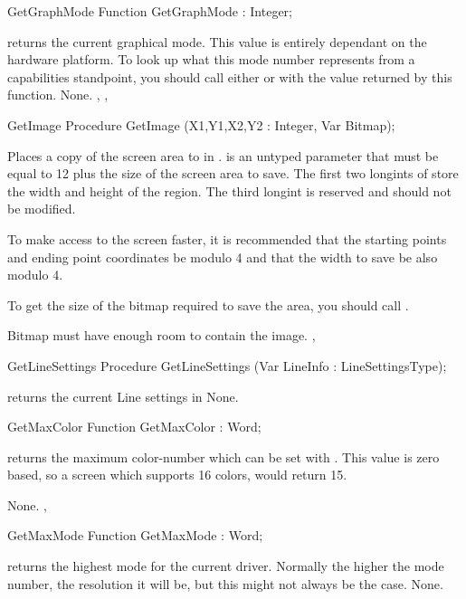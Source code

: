\begin{function}{GetGraphMode}
\Declaration
Function GetGraphMode  : Integer;

\Description
{} returns the current graphical mode. This value is
entirely dependant on the hardware platform. To look up what this
mode number represents from a capabilities standpoint, you should
call either  or  with the
value returned by this function.
\Errors
None.
\SeeAlso
{}, , 
\end{function}

\begin{procedure}{GetImage}
\Declaration
Procedure GetImage (X1,Y1,X2,Y2 : Integer, Var Bitmap);

\Description
{}
Places a copy of the screen area  to  in .
 is an untyped parameter that must be equal to 12 plus the size
of the screen area to save. The first two longints of  store
the width and height of the region. The third longint is reserved and should
not be modified.

To make access to the screen faster, it is recommended that the starting
points and ending point coordinates be modulo 4 and that the width to
save be also modulo 4.

To get the size of the bitmap required to save the area, you should call
.

\Errors
Bitmap must have enough room to contain the image.
\SeeAlso
{},
\end{procedure}

\begin{procedure}{GetLineSettings}
\Declaration
Procedure GetLineSettings (Var LineInfo : LineSettingsType);

\Description
{} returns the current Line settings in
\Errors
None.
\SeeAlso
{}
\end{procedure}
\begin{function}{GetMaxColor}
\Declaration
Function GetMaxColor  : Word;

\Description
{} returns the maximum color-number which can
be set with . This value is zero based, so a screen
which supports 16 colors, would return 15.

\Errors
None.
\SeeAlso
{},
\end{function}
\begin{function}{GetMaxMode}
\Declaration
Function GetMaxMode  : Word;

\Description
{} returns the highest mode for the current driver. Normally
the higher the mode number, the resolution it will be, but this might not
always be the case.
\Errors
None.
\SeeAlso
{}
\end{function}

